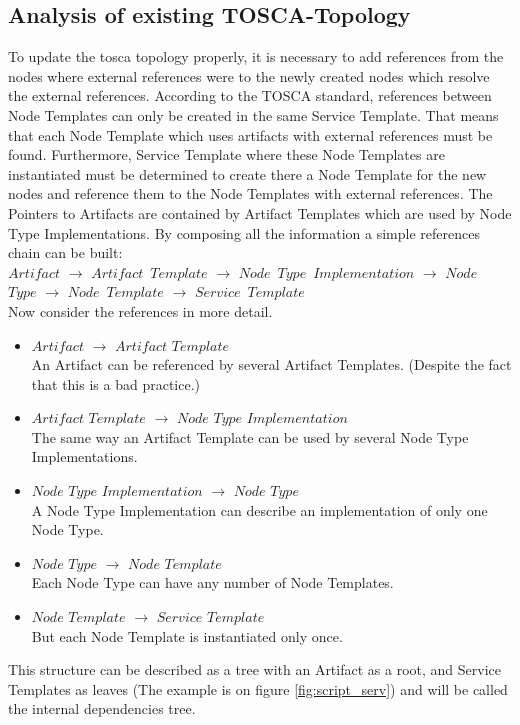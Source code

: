 \subsection{Analysis of existing TOSCA-Topology}\label{subs:analyse}
To update the \gls{tosca} topology properly, it is necessary to add references from the nodes where external references were to the newly created nodes which resolve the external references. 
According to the TOSCA standard, references between Node Templates can only be created in the same Service Template.  
That means that each Node Template which uses artifacts with external references must be found.
Furthermore, Service Template where these Node Templates are instantiated must be determined to create there a Node Template for the new nodes and reference them to the Node Templates with external references.
The Pointers to Artifacts are contained by Artifact Templates which are used by Node Type Implementations.
By composing all the information a simple references chain can be built:\\
$Artifact$ $\rightarrow$ $Artifact$~$Template$ $\rightarrow$ $Node$~$Type$~$Implementation$ $\rightarrow$ $Node$~$Type$ $\rightarrow$ $Node$~$Template$ $\rightarrow$ $Service$~$Template$\\
Now consider the references in more detail. 
\begin{itemize}
	\item $Artifact$ $\rightarrow$ $Artifact$ $Template$\\
	An Artifact can be referenced by several Artifact Templates. (Despite the fact that this is a bad practice.)
	\item  $Artifact$ $Template$ $\rightarrow$ $Node$ $Type$ $Implementation$ \\
	The same way an Artifact Template can be used by several Node Type Implementations.
	\item $Node$ $Type$ $Implementation$ $\rightarrow$ $Node$ $Type$ \\
	A Node Type Implementation can describe an implementation of only one Node Type.
	\item  $Node$ $Type$ $\rightarrow$ $Node$ $Template$\\
	Each Node Type can have any number of Node Templates.
	\item  $Node$ $Template$ $\rightarrow$ $Service$ $Template$\\
	But each Node Template is instantiated only once.
\end{itemize}
This structure can be described as a tree with an Artifact as a root, and Service Templates as leaves (The example is on figure \ref{fig:script_serv}) and will be called the internal dependencies tree.\\
